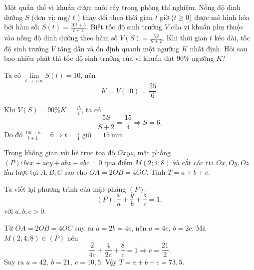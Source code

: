 \begin{baitap}
	Một quần thể vi khuẩn được nuôi cấy trong phòng thí nghiệm. Nồng độ dinh dưỡng $S$ (đơn vị: $\mathrm{mg/\ell}$) thay đổi theo thời gian $t$ giờ ($t \ge 0$) được mô hình hóa bởi hàm số: $S(t) = \frac{10t + 5}{t + 1}$. Biết tốc độ sinh trưởng $V$ của vi khuẩn phụ thuộc vào nồng độ dinh dưỡng theo hàm số $V(S) = \frac{5S}{S + 2}$. Khi thời gian $t$ kéo dài, tốc độ sinh trưởng $V$ tăng dần và ổn định quanh một ngưỡng $K$ nhất định. Hỏi sau bao nhiêu phút thì tốc độ sinh trưởng của vi khuẩn đạt $90\%$ ngưỡng $K$?
	\begin{traloi}
		Ta có $\lim\limits_{t\to+\infty}S(t)=10$, nên
		$$K=V(10)=\frac{25}{6}.$$
		
		Khi $V(S)=90\%K=\frac{15}{4}$, ta có
		$$\frac{5S}{S+2}=\frac{15}{4}\Rightarrow S=6.$$		
		Do đó $\frac{10t+5}{t+1}=6\Rightarrow t=\frac14$ giờ $=\qty{15}{\minute}$.
	\end{traloi}
\end{baitap}

\begin{baitap}
	Trong không gian với hệ trục tọa độ $Oxyz$, mặt phẳng $(P) : bcx + acy + abz - abc = 0$ qua điểm $M(2; 4; 8)$ và cắt các tia $Ox, Oy, Oz$ lần lượt tại $A, B, C$ sao cho $OA = 2OB = 4OC$. Tính $T = a + b + c$.
	\begin{traloi}
		\dapan{73,5}
		Ta viết lại phương trình của mặt phẳng \((P)\): $$(P):\frac{x}{a}+\frac{y}{b}+\frac{z}{c}=1,$$ với $a,b,c>0$.
		
		Từ $OA=2OB=4OC$ suy ra $a=2b=4c$, nên $a=4c,\ b=2c$.	Mà $M(2;4;8)\in(P)$ nên
		\[
		\frac{2}{4c}+\frac{4}{2c}+\frac{8}{c}=1
		\Rightarrow c=\frac{21}{2}.
		\]
		Suy ra $a=42,\ b=21,\ c=10{,}5$. Vậy $T=a+b+c=73{,}5$.
	\end{traloi}
\end{baitap}
